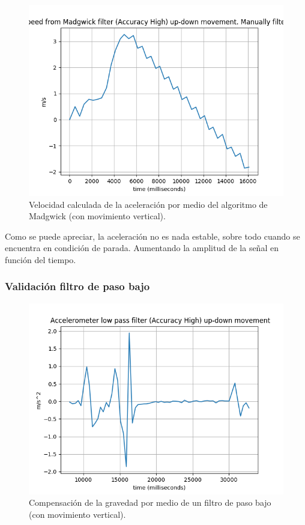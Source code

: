 \begin{figure}[H]
	\centering
	\includegraphics[scale=0.5]{imagenes/madwickup-downSpeed.png}
	\caption{Velocidad calculada de la aceleración por medio del algoritmo de Madgwick (con movimiento vertical).}
	\label{Velocidad vertical Madgwick}
\end{figure}
\noindent
Como se puede apreciar, la aceleración no es nada estable, sobre todo cuando se encuentra en condición de parada. Aumentando la amplitud de la señal en función del tiempo.

\subsubsection{Validación filtro de paso bajo}

\begin{figure}[H]
	\centering
	\includegraphics[scale=0.5]{imagenes/lowpassUpmov.png}
	\caption{Compensación de la gravedad por medio de un filtro de paso bajo (con movimiento vertical).}
	\label{Movimiento vertical filtro paso bajo}
\end{figure}

